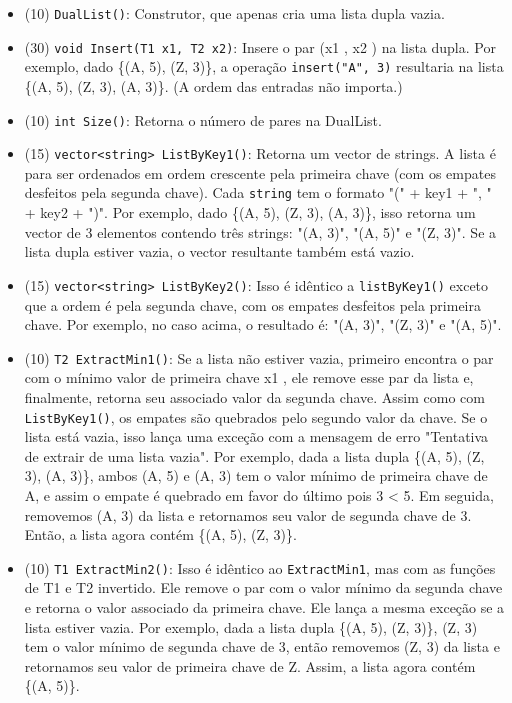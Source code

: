 \documentclass{article}
\begin{document}
\begin{itemize}
    \item (10) \texttt{DualList()}: Construtor, que apenas cria uma lista dupla vazia.
    \item (30) \texttt{void Insert(T1 x1, T2 x2)}: Insere o par (x1 , x2 ) na lista dupla. Por exemplo, dado \{(A, 5), (Z, 3)\}, a operação \texttt{insert("A", 3)} resultaria na lista \{(A, 5), (Z, 3), (A, 3)\}. (A ordem das entradas não importa.)
    \item (10) \texttt{int Size()}: Retorna o número de pares na DualList.
    \item (15) \texttt{vector<string> ListByKey1()}: Retorna um vector de strings. A lista é para ser ordenados em ordem crescente pela primeira chave (com os empates desfeitos pela segunda chave). Cada \texttt{string} tem o formato "(" + key1 + ", " + key2 + ")". Por exemplo, dado \{(A, 5), (Z, 3), (A, 3)\}, isso retorna um vector de 3 elementos contendo três strings: "(A, 3)", "(A, 5)" e "(Z, 3)". Se a lista dupla estiver vazia, o vector resultante também está vazio.
    \item (15) \texttt{vector<string> ListByKey2()}: Isso é idêntico a \texttt{listByKey1()} exceto que a ordem é pela segunda chave, com os empates desfeitos pela primeira chave. Por exemplo, no caso acima, o resultado é: "(A, 3)", "(Z, 3)" e "(A, 5)".
    \item (10) \texttt{T2 ExtractMin1()}: Se a lista não estiver vazia, primeiro encontra o par com o mínimo valor de primeira chave x1 , ele remove esse par da lista e, finalmente, retorna seu associado valor da segunda chave. Assim como com \texttt{ListByKey1()}, os empates são quebrados pelo segundo valor da chave. Se o lista está vazia, isso lança uma exceção com a mensagem de erro "Tentativa de extrair de uma lista vazia". Por exemplo, dada a lista dupla \{(A, 5), (Z, 3), (A, 3)\}, ambos (A, 5) e (A, 3) tem o valor mínimo de primeira chave de A, e assim o empate é quebrado em favor do último pois 3 < 5. Em seguida, removemos (A, 3) da lista e retornamos seu valor de segunda chave de 3. Então, a lista agora contém \{(A, 5), (Z, 3)\}.
    \item (10) \texttt{T1 ExtractMin2()}: Isso é idêntico ao \texttt{ExtractMin1}, mas com as funções de T1 e T2 invertido. Ele remove o par com o valor mínimo da segunda chave e retorna o valor associado da primeira chave. Ele lança a mesma exceção se a lista estiver vazia. Por exemplo, dada a lista dupla \{(A, 5), (Z, 3)\}, (Z, 3) tem o valor mínimo de segunda chave de 3, então removemos (Z, 3) da lista e retornamos seu valor de primeira chave de Z. Assim, a lista agora contém \{(A, 5)\}.
    \end{itemize}
\end{document}
